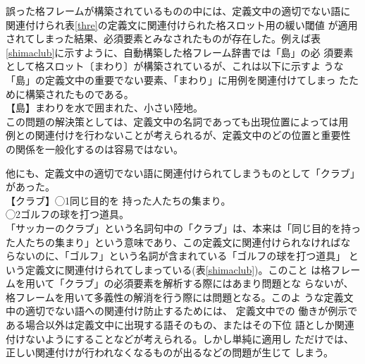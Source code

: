 \documentclass{nlp}
\begin{document}
  誤った格フレームが構築されているものの中には、定義文中の適切でない語に
  関連付けられ表\ref{thre}の定義文に関連付けられた格スロット用の緩い閾値
  が適用されてしまった結果、必須要素とみなされたものが存在した。例えば表
  \ref{shimaclub}に示すように、自動構築した格フレーム辞書では「島」の必
  須要素として格スロット〔まわり〕が構築されているが、これは以下に示すよ
  うな「島」の定義文中の重要でない要素、「まわり」に用例を関連付けてしまっ
  たために構築されたものである。
  \vspace{1.5ex}\\
  \hspace{1em}【島】まわりを水で囲まれた、小さい陸地。
  \vspace{1.5ex}\\
  この問題の解決策としては、定義文中の名詞であっても出現位置によっては用
  例との関連付けを行わないことが考えられるが、定義文中のどの位置と重要性
  の関係を一般化するのは容易ではない。

  他にも、定義文中の適切でない語に関連付けられてしまうものとして「クラブ」
  があった。
  \vspace{1.5ex}\\
  \hspace{1em}【クラブ】◯\hspace{-0.77em}1\hspace{0.6em}同じ目的を
  持った人たちの集まり。\\
  \hspace{5.8em}◯\hspace{-0.77em}2\hspace{0.6em}ゴルフの球を打つ道具。
  \vspace{1.5ex}\\
 「サッカーのクラブ」という名詞句中の「クラブ」は、本来は「同じ目的を持っ
  た人たちの集まり」という意味であり、この定義文に関連付けられなければな
  らないのに、「ゴルフ」という名詞が含まれている「ゴルフの球を打つ道具」
  という定義文に関連付けられてしまっている(表\ref{shimaclub})。このこと
  は格フレームを用いて「クラブ」の必須要素を解析する際にはあまり問題とな
  らないが、格フレームを用いて多義性の解消を行う際には問題となる。このよ
  うな定義文中の適切でない語への関連付け防止するためには、 定義文中での
  働きが例示である場合以外は定義文中に出現する語そのもの、またはその下位
  語としか関連付けないようにすることなどが考えられる。しかし単純に適用し
  ただけでは、正しい関連付けが行われなくなるものが出るなどの問題が生じて
  しまう。
\end{document}
